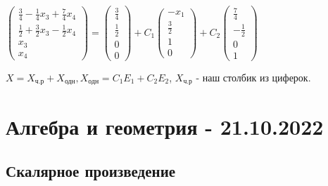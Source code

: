 \documentclass{article}
\begin{document}
\begin{flushleft}
$\begin{pmatrix}
    \frac{3}{4} - \frac{1}{4}x_3 + \frac{7}{4}x_4 \\
    \frac{1}{2} + \frac{3}{2}x_3 - \frac{1}{2}x_4 \\
    x_3 \\
    x_4
\end{pmatrix} = \begin{pmatrix}
    \frac{3}{4} \\
    \frac{1}{2} \\
    0 \\
    0
\end{pmatrix} + C_1 \begin{pmatrix}
    -x_1 \\
    \frac{3}{2} \\
    1 \\
    0
\end{pmatrix} + C_2 \begin{pmatrix}
    \frac{7}{4} \\
    -\frac{1}{2} \\
    0 \\
    1
\end{pmatrix}$

\hfill

$X = X_{\text{ч.р}} + X_{\text{одн}}, X_{\text{одн}} = C_1E_1 + C_2E_2$, $X_{\text{ч.р}}$ - наш столбик из циферок.

\end{flushleft}

\pagebreak
\section{Алгебра и геометрия - 21.10.2022}

\subsection{Скалярное произведение}
\end{document}
